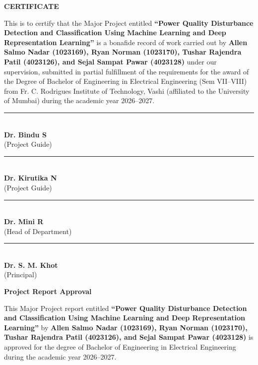 \documentclass[12pt,a4paper]{report}
\begin{document}
\begin{center}
    \vspace*{1.5cm}
    \textbf{\LARGE CERTIFICATE}\\[1.5cm]
\end{center}
\noindent
This is to certify that the Major Project entitled \textbf{``Power Quality Disturbance Detection and Classification Using Machine Learning and Deep Representation Learning''} is a bonafide record of work carried out by \textbf{Allen Salmo Nadar (1023169), Ryan Norman (1023170), Tushar Rajendra Patil (4023126), and Sejal Sampat Pawar (4023128)} under our supervision, submitted in partial fulfillment of the requirements for the award of the Degree of Bachelor of Engineering in Electrical Engineering (Sem VII--VIII) from Fr. C. Rodrigues Institute of Technology, Vashi (affiliated to the University of Mumbai) during the academic year 2026--2027.\par\vspace{2.5cm}

\noindent
\begin{minipage}[t]{0.45\textwidth}
\centering
\rule{6cm}{0.4pt} \\[0.2cm]
\textbf{Dr. Bindu S} \\[0.1cm]
(Project Guide)
\end{minipage}
\hfill
\begin{minipage}[t]{0.45\textwidth}
\centering
\rule{6cm}{0.4pt} \\[0.2cm]
\textbf{Dr. Kirutika N} \\[0.1cm]
(Project Guide)
\end{minipage}

\vspace{2.5cm}

\noindent
\begin{minipage}[t]{0.45\textwidth}
\centering
\rule{6cm}{0.4pt} \\[0.2cm]
\textbf{Dr. Mini R} \\[0.1cm]
(Head of Department)
\end{minipage}
\hfill
\begin{minipage}[t]{0.45\textwidth}
\centering
\rule{6cm}{0.4pt} \\[0.2cm]
\textbf{Dr. S. M. Khot} \\[0.1cm]
(Principal)
\end{minipage}
\clearpage

\begin{center}
    \vspace*{1.5cm}
    \textbf{\LARGE Project Report Approval}\\[1.5cm]
\end{center}
\noindent
This Major Project report entitled \textbf{``Power Quality Disturbance Detection and Classification Using Machine Learning and Deep Representation Learning''} by \textbf{Allen Salmo Nadar (1023169), Ryan Norman (1023170), Tushar Rajendra Patil (4023126), and Sejal Sampat Pawar (4023128)} is approved for the degree of Bachelor of Engineering in Electrical Engineering during the academic year 2026--2027.\par\vspace{1.8cm}
\end{document}
